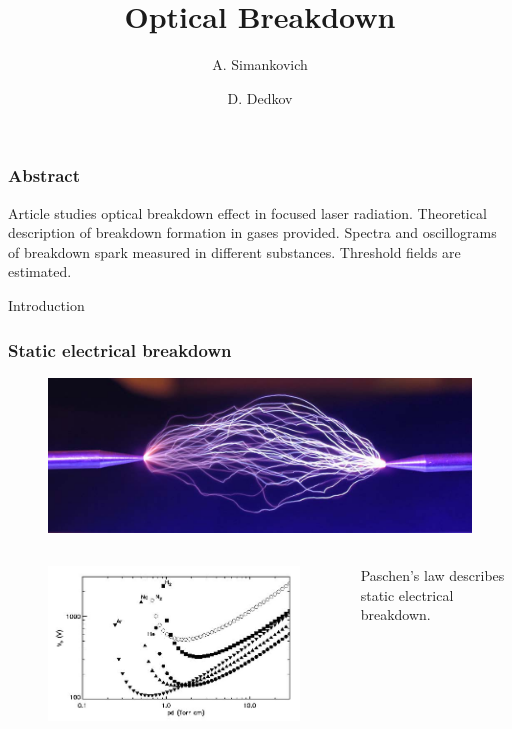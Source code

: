 \documentclass{beamer}
\title[About Beamer] %
{Optical Breakdown}
\author[Arthur, Doe] %
{A. Simankovich \and D. Dedkov }
\institute[VFU] %
{
	Moscow Institute of Physics and Technology
}
\date[VLC 2023] %
\begin{document}
	
	\frame{\titlepage}
	
	\begin{frame}
		\frametitle{Abstract}
		
		Article studies optical breakdown effect in focused laser radiation. Theoretical description of breakdown formation in gases provided. Spectra and oscillograms of breakdown spark measured in different substances. Threshold fields are estimated.
	\end{frame}
	
	
	\begin{frame}[plain,c]
		
		\begin{center}
			\huge {} Introduction
		\end{center}
		
	\end{frame}
	
	
	\begin{frame}
		\frametitle{Static electrical breakdown}
		
		\begin{figure}
			\includegraphics[width=0.8\linewidth]{res/const_discharge.jpg}
		\end{figure}
		
		\begin{columns}
			\begin{figure}
				\includegraphics[width=\linewidth]{res/paschen.jpg}
			\end{figure}
			
			Paschen's law describes static electrical breakdown.
		\end{columns}
		
	\end{frame}
	
\end{document}
